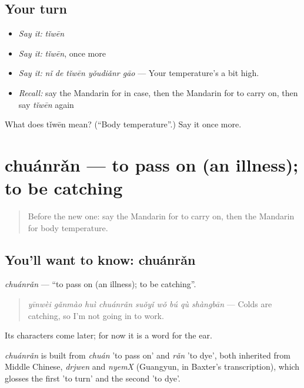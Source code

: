 \subsection*{Your turn}
\begin{itemize}
\raggedright
  \item \emph{Say it:} \emph{tǐwēn}
  \item \emph{Say it:} \emph{tǐwēn}, once more
  \item \emph{Say it:} \emph{nǐ de tǐwēn yǒudiǎnr gāo} — Your temperature's a bit high.
  \item \emph{Recall:} say the Mandarin for in case, then the Mandarin for to carry on, then say \emph{tǐwēn} again
\end{itemize}

\begin{tcolorbox}[breakable,colback=teal!4,colframe=teal!35!black,title={Before you move on}]
What does tǐwēn mean? (\textquotedblleft{}Body temperature\textquotedblright{}.) Say it once more.
\end{tcolorbox}
\section[chuánrǎn]{chuánrǎn — to pass on (an illness); to be catching}

\label{lesson:ZH-C245-chuanran}



\begin{quote}
Before the new one: say the Mandarin for to carry on, then the Mandarin for body temperature.
\end{quote}

\subsection*{You'll want to know: chuánrǎn}
\emph{chuánrǎn} — \textquotedblleft{}to pass on (an illness); to be catching\textquotedblright{}.

\begin{quote}
\emph{yīnwèi gǎnmào huì chuánrǎn suǒyǐ wǒ bú qù shàngbān} — Colds are catching, so I'm not going in to work.
\end{quote}

Its characters come later; for now it is a word for the ear.

\begin{cousinweb}
\emph{chuánrǎn} is built from \emph{chuán} 'to pass on' and \emph{rǎn} 'to dye', both inherited from Middle Chinese, \emph{drjwen} and \emph{nyemX} (Guangyun, in Baxter's transcription), which glosses the first 'to turn' and the second 'to dye'.
\end{cousinweb}

